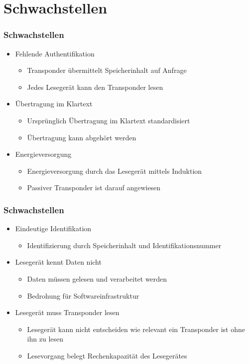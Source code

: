 \documentclass{beamer}
\begin{document}
\section{Schwachstellen}
\begin{frame}
\frametitle{Schwachstellen}

\begin{itemize}
	\item Fehlende Authentifikation
	\begin{itemize}
		\item Transponder übermittelt Speicherinhalt auf Anfrage
		\item Jedes Lesegerät kann den Transponder lesen
	\end{itemize}
	
	\item Übertragung im Klartext
	\begin{itemize}
		\item Ursprünglich Übertragung im Klartext standardisiert
		\item Übertragung kann abgehört werden
	\end{itemize}
	
	\item Energieversorgung
	\begin{itemize}
		\item Energieversorgung durch das Lesegerät mittels Induktion
		\item Passiver Transponder ist darauf angewiesen
	\end{itemize}
\end{itemize}
\end{frame}


\begin{frame}
\frametitle{Schwachstellen}

\begin{itemize}
	\item Eindeutige Identifikation
	\begin{itemize}
		\item Identifizierung durch Speicherinhalt und Identifikationsnummer
	\end{itemize}
	
	\item Lesegerät kennt Daten nicht
	\begin{itemize}
		\item Daten müssen gelesen und verarbeitet werden
		\item Bedrohung für Softwareinfrastruktur
	\end{itemize}
	
	\item Lesegerät muss Transponder lesen
	\begin{itemize}
		\item Lesegerät kann nicht entscheiden wie relevant ein Transponder ist ohne ihn zu lesen
		\item Lesevorgang belegt Rechenkapazität des Lesegerätes
	\end{itemize}
\end{itemize}
\end{frame}
\end{document}
